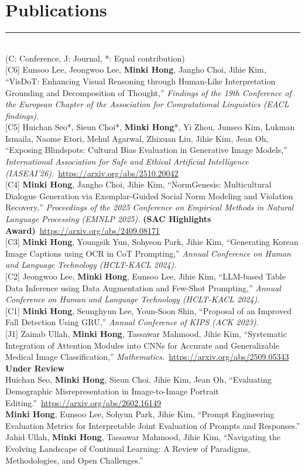 \documentclass[10pt,letterpaper]{article}
\newcommand{\sectionrule}{\vspace{-0.5em}\rule{\textwidth}{0.4pt}\\[0.2em]}
\begin{document}
\section{Publications}
\sectionrule
(C: Conference, J: Journal, *: Equal contribution)\\[4pt]
[C6] Eunsoo Lee, Jeongwoo Lee, \textbf{Minki Hong}, Jangho Choi, Jihie Kim, ``VisDoT: Enhancing Visual Reasoning through Human-Like Interpretation Grounding and Decomposition of Thought,'' \textit{Findings of the 19th Conference of the European Chapter of the Association for Computational Linguistics (EACL findings).}\\[2pt]
[C5] Huichan Seo*, Sieun Choi*, \textbf{Minki Hong}*, Yi Zhou, Junseo Kim, Lukman Ismaila, Naome Etori, Mehul Agarwal, Zhixuan Liu, Jihie Kim, Jean Oh, ``Exposing Blindspots: Cultural Bias Evaluation in Generative Image Models,'' \textit{International Association for Safe and Ethical Artificial Intelligence (IASEAI'26).}~\url{https://arxiv.org/abs/2510.20042}\\[2pt]
[C4] \textbf{Minki Hong}, Jangho Choi, Jihie Kim, ``NormGenesis: Multicultural Dialogue Generation via Exemplar-Guided Social Norm Modeling and Violation Recovery,'' \textit{Proceedings of the 2025 Conference on Empirical Methods in Natural Language Processing (EMNLP 2025).} \textbf{(SAC Highlights Award)}~\url{https://arxiv.org/abs/2409.08171}\\[2pt]
[C3] \textbf{Minki Hong}, Youngsik Yun, Sohyeon Park, Jihie Kim, ``Generating Korean Image Captions using OCR in CoT Prompting,'' \textit{Annual Conference on Human and Language Technology (HCLT-KACL 2024).}\\[2pt]
[C2] Jeongwoo Lee, \textbf{Minki Hong}, Eunsoo Lee, Jihie Kim, ``LLM-based Table Data Inference using Data Augmentation and Few-Shot Prompting,'' \textit{Annual Conference on Human and Language Technology (HCLT-KACL 2024).}\\[2pt]
[C1] \textbf{Minki Hong}, Seunghyun Lee, Youn-Soon Shin, ``Proposal of an Improved Fall Detection Using GRU,'' \textit{Annual Conference of KIPS (ACK 2023).}\\[2pt]
[J1] Zainab Ullah, \textbf{Minki Hong}, Tassawar Mahmood, Jihie Kim, ``Systematic Integration of Attention Modules into CNNs for Accurate and Generalizable Medical Image Classification,'' \textit{Mathematics.}~\url{https://arxiv.org/abs/2509.05343}\\[4pt]
\vspace{2pt}
{\large\textbf{Under Review}}\\[2pt]
Huichan Seo, \textbf{Minki Hong}, Sieun Choi, Jihie Kim, Jean Oh, ``Evaluating Demographic Misrepresentation in Image-to-Image Portrait Editing.''~\url{https://arxiv.org/abs/2602.16149}\\[2pt]
\textbf{Minki Hong}, Eunsoo Lee, Sohyun Park, Jihie Kim, ``Prompt Engineering Evaluation Metrics for Interpretable Joint Evaluation of Prompts and Responses.''\\[2pt]
Jahid Ullah, \textbf{Minki Hong}, Tassawar Mahmood, Jihie Kim, ``Navigating the Evolving Landscape of Continual Learning: A Review of Paradigms, Methodologies, and Open Challenges.''
\end{document}
